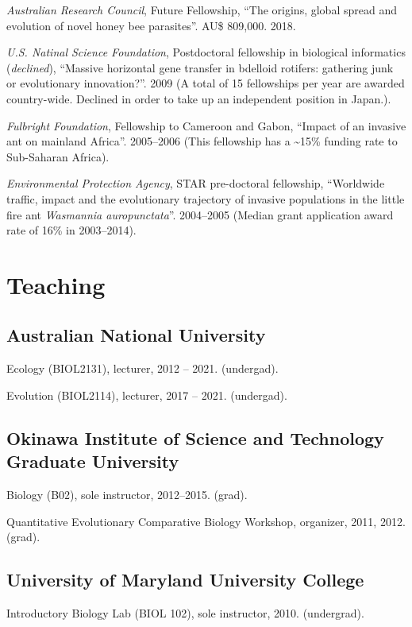 \documentclass[11pt]{article}
\begin{document}
\ind \textit{Australian Research Council}, Future Fellowship, ``The
origins, global spread and evolution of novel honey bee
parasites''.  AU\$ 809,000. 2018.









\ind \textit{U.S. Natinal Science Foundation}, Postdoctoral fellowship
in biological informatics (\textit{declined}), ``Massive horizontal gene
transfer in bdelloid rotifers: gathering junk or evolutionary
innovation?''.  2009 (A total of 15 fellowships per year are awarded
country-wide. Declined in order to take up an independent position in
Japan.).


\ind \textit{Fulbright Foundation}, Fellowship to Cameroon and
Gabon, ``Impact of an invasive ant on mainland
Africa''.  2005--2006 (This fellowship has a \textasciitilde15\% funding
rate to Sub-Saharan Africa).


\ind \textit{Environmental Protection Agency}, STAR pre-doctoral
fellowship, ``Worldwide traffic, impact and the evolutionary trajectory
of invasive populations in the little fire ant
\textit{Wasmannia auropunctata}''.  2004--2005 (Median grant application
award rate of 16\% in 2003--2014).



\section{Teaching}

\subsection{Australian National University}
\ind Ecology (BIOL2131), lecturer, 2012 -- 2021. (undergad).

\ind Evolution (BIOL2114), lecturer, 2017 -- 2021. (undergad).

\subsection{Okinawa Institute of Science and Technology Graduate
University}
\ind Biology (B02), sole instructor, 2012--2015. (grad).

\ind Quantitative Evolutionary Comparative Biology
Workshop, organizer, 2011, 2012. (grad).

\subsection{University of Maryland University College}
\ind Introductory Biology Lab (BIOL 102), sole
instructor, 2010. (undergrad).
\end{document}
